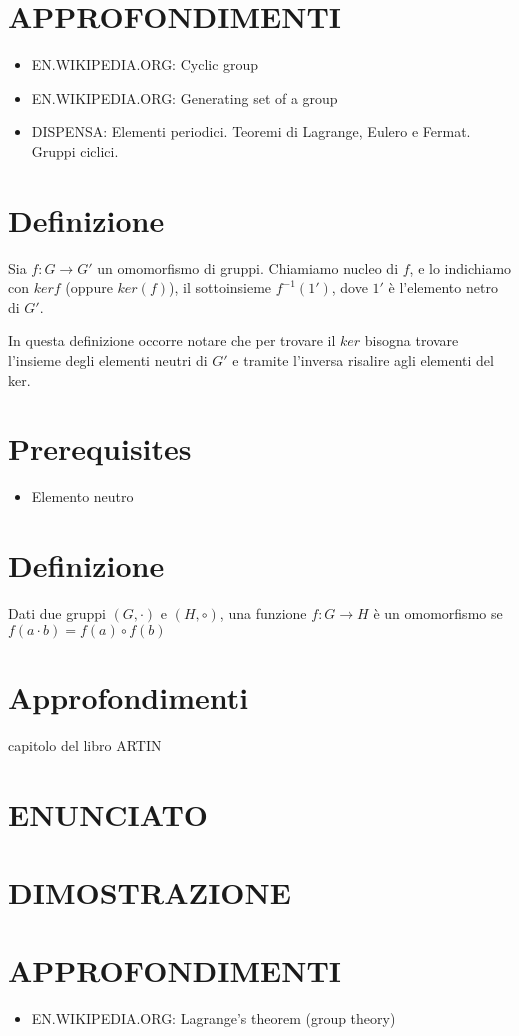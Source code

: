 \section{APPROFONDIMENTI}
\begin{itemize}
 \item EN.WIKIPEDIA.ORG: Cyclic group \cite{cyclicgroup1}
 \item EN.WIKIPEDIA.ORG: Generating set of a group \cite{cyclicgroup2}
 \item DISPENSA: Elementi periodici. Teoremi di Lagrange, Eulero e Fermat. Gruppi ciclici. \cite{cyclicgroup3}
\end{itemize}




\section{Definizione}
Sia $f:G \longrightarrow G'$ un omomorfismo di gruppi.
Chiamiamo nucleo di $f$, e lo indichiamo con $ker f$ (oppure $ker(f)$), il sottoinsieme $f^{-1}({1'})$, dove $1'$ è l'elemento netro di $G'$. \cite{progmat1}

In questa definizione occorre notare che per trovare il $ker$ bisogna trovare l'insieme degli elementi neutri di $G'$ e tramite l'inversa risalire agli elementi del ker.

\section{Prerequisites}
\begin{itemize}
 \item Elemento neutro
\end{itemize}




\section{Definizione}
Dati due gruppi $(G,\cdot)$ e $(H, \circ)$, una funzione $f:G \longrightarrow H$ è un omomorfismo se
$f(a \cdot b) = f(a) \circ f(b)$


\section{Approfondimenti}
capitolo del libro ARTIN



\section{ENUNCIATO}

\section{DIMOSTRAZIONE}

\section{APPROFONDIMENTI}
\begin{itemize}
 \item EN.WIKIPEDIA.ORG: Lagrange's theorem (group theory) \cite{orderofgroup2}
\end{itemize}


